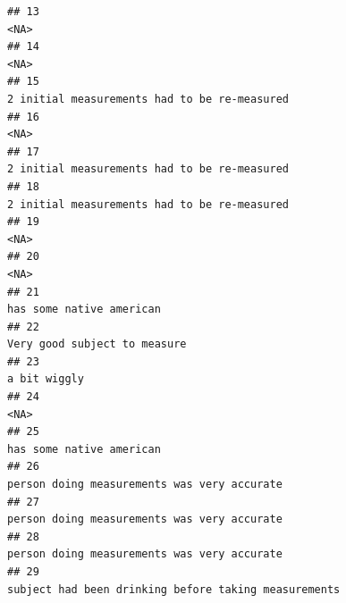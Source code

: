 \documentclass[]{article}
\begin{document}
\begin{verbatim}
## 13                                                                                                                                                 <NA>
## 14                                                                                                                                                 <NA>
## 15                                                                                                         2 initial measurements had to be re-measured
## 16                                                                                                                                                 <NA>
## 17                                                                                                         2 initial measurements had to be re-measured
## 18                                                                                                         2 initial measurements had to be re-measured
## 19                                                                                                                                                 <NA>
## 20                                                                                                                                                 <NA>
## 21                                                                                                                             has some native american
## 22                                                                                                                         Very good subject to measure
## 23                                                                                                                                         a bit wiggly
## 24                                                                                                                                                 <NA>
## 25                                                                                                                             has some native american
## 26                                                                                                          person doing measurements was very accurate
## 27                                                                                                          person doing measurements was very accurate
## 28                                                                                                          person doing measurements was very accurate
## 29                                                                                                 subject had been drinking before taking measurements

\end{verbatim}
\end{document}

